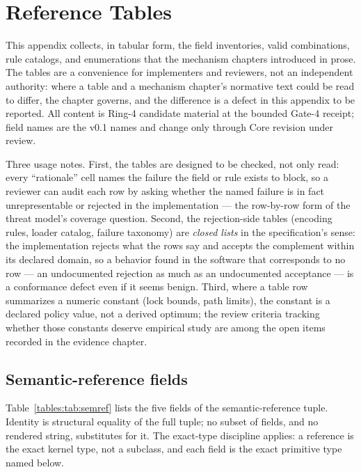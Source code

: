 \chapter{Reference Tables}\label{tables:chapter}

This appendix collects, in tabular form, the field inventories, valid combinations, rule catalogs, and enumerations that the mechanism chapters introduced in prose. The tables are a convenience for implementers and reviewers, not an independent authority: where a table and a mechanism chapter's normative text could be read to differ, the chapter governs, and the difference is a defect in this appendix to be reported. All content is Ring-4 candidate material at the bounded Gate-4 receipt; field names are the v0.1 names and change only through Core revision under review.

Three usage notes. First, the tables are designed to be checked, not only read: every ``rationale'' cell names the failure the field or rule exists to block, so a reviewer can audit each row by asking whether the named failure is in fact unrepresentable or rejected in the implementation --- the row-by-row form of the threat model's coverage question. Second, the rejection-side tables (encoding rules, loader catalog, failure taxonomy) are \emph{closed lists} in the specification's sense: the implementation rejects what the rows say and accepts the complement within its declared domain, so a behavior found in the software that corresponds to no row --- an undocumented rejection as much as an undocumented acceptance --- is a conformance defect even if it seems benign. Third, where a table row summarizes a numeric constant (lock bounds, path limits), the constant is a declared policy value, not a derived optimum; the review criteria tracking whether those constants deserve empirical study are among the open items recorded in the evidence chapter.

\section{Semantic-reference fields}\label{tables:semref}

Table~\ref{tables:tab:semref} lists the five fields of the semantic-reference tuple. Identity is structural equality of the full tuple; no subset of fields, and no rendered string, substitutes for it. The exact-type discipline applies: a reference is the exact kernel type, not a subclass, and each field is the exact primitive type named below.

